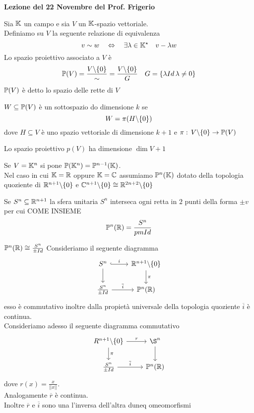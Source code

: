 


\textbf{Lezione del 22 Novembre del Prof. Frigerio}
\begin{defn}\bianco
Sia $\mathbb{K}$ un campo e sia $V$ un $\mathbb{K}$-spazio vettoriale.\\
Definiamo su $V$ la seguente relazione di equivalenza
$$ v \sim w \quad \Leftrightarrow \quad \exists \lambda \in \mathbb{K}^\star \quad v - \lambda w $$
Lo spazio proiettivo associato a $V$ \`e
$$ \mathbb{P} (V) = \frac{V \backslash \{ 0 \}}{\sim}= \frac{V \backslash  \{ 0\}}{G} \quad G = \{ \lambda Id \, \lambda\neq 0 \}$$
$\mathbb{P}(V)$ \`e detto lo spazio delle rette di $V$
\end{defn}
\begin{defn}\bianco$W \subseteq \mathbb{P}(V)$ \`e un sottospazio do dimensione $k$ se 
$$ W = \pi ( H \backslash \{ 0\})$$ dove $H \subseteq V $ \`e uno spazio vettoriale di dimensione $k+1$ e $\pi:\, V \backslash \{ 0 \} \to \mathbb{P}(V)$
\end{defn}
\begin{oss}Lo spazio proiettivo $p(V)$ ha dimensione $\dim V +1$
\end{oss}
\begin{oss}Se $V=\mathbb{K}^n$ si pone $\mathbb{P}(\mathbb{K}^n)=\mathbb{P}^{n-1}(\mathbb{K})$.\\
Nel caso in cui $\mathbb{K}=\mathbb{R}$ oppure $\mathbb{K}=\mathbb{C}$ assumiamo $\mathbb{P}^n(\mathbb{K})$ dotato della topologia quoziente di $\mathbb{R}^{n+1}\backslash \{ 0 \}$ e $\mathbb{C}^{n+1}\backslash \{ 0 \} \cong \mathbb{R}^{2n+2} \backslash \{ 0 \}$
\end{oss}
\spazio
\begin{oss}Se $S^n\subseteq \mathbb{R}^{n+1}$ la sfera unitaria $S^n$ interseca ogni retta in $2$ punti della forma $\pm v$ per cui COME INSIEME 
$$ \mathbb{P}^n (\mathbb{R}) = \frac{S^n}{pm Id}$$
\end{oss}
\begin{prop}$\mathbb{P}^n(\mathbb{R}) \cong \frac{S^n}{\pm Id}$
\proof 
Consideriamo il seguente diagramma
$$ \begin{tikzcd} S^n \arrow[hook, r,"i"] \arrow[d]& \R^{n+1} \sbarra \{ 0 \} \arrow{d}{\pi} \\ \frac{S^n}{\pm Id} \arrow{r}{\overline{i}} &\p^n(\R)
\end{tikzcd}$$
esso \`e commutativo inoltre dalla propiet\`a universale della topologia quoziente $\overline{i}$ \`e continua.\\
Consideriamo adesso il seguente diagramma commutativo
$$ \begin{tikzcd} R^{n+1}\sbarra \{ 0\} \arrow[ r,"r"] \arrow{d}{\pi}& \S^{n} \arrow[d] \\ \frac{S^n}{\pm Id} \arrow{r}{\overline{i}} &\p^n(\R)
\end{tikzcd}$$
dove $r(x)=\frac{x}{\vert \vert x \vert\vert}$.\\
Analogamente $\overline{r}$ \`e continua.\\
Inoltre $\overline{r}$ e $\overline{i}$ sono una l'inversa dell'altra duneq omeomorfismi\endproof
\end{prop}
